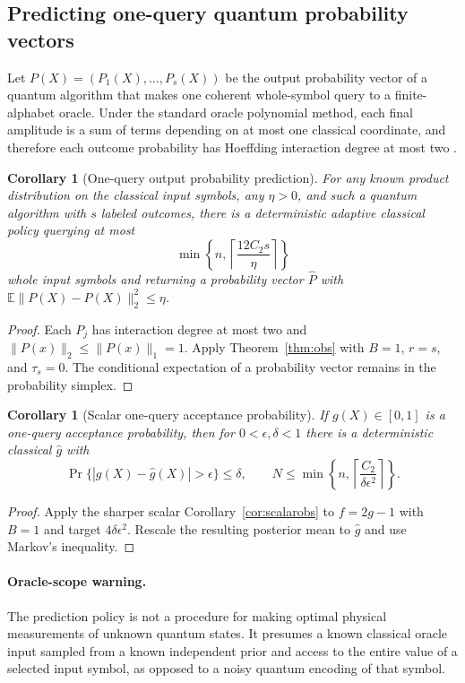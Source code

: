 \documentclass[11pt,letterpaper]{article}
\newtheorem{corollary}[theorem]{Corollary}
\theoremstyle{definition}
\newcommand{\E}{\mathbb E}
\newcommand{\norm}[1]{\lVert #1\rVert}
\begin{document}
\subsection{Predicting one-query quantum probability vectors}
Let $P(X)=(P_1(X),\ldots,P_s(X))$ be the output probability vector of a
quantum algorithm that makes one coherent whole-symbol query to a
finite-alphabet oracle. Under the standard oracle polynomial method,
each final amplitude is a sum of terms depending on at most one
classical coordinate, and therefore each outcome probability has
Hoeffding interaction degree at most two \cite{BBCMW2001}.
\begin{corollary}[One-query output probability prediction]\label{cor:oneq}
For any known product distribution on the classical input symbols,
any $\eta>0$, and such a quantum algorithm with $s$ labeled outcomes,
there is a deterministic adaptive classical policy querying at most
\[\min\left\{n,\left\lceil\frac{12C_2s}{\eta}\right\rceil\right\}
\]
whole input symbols and returning a probability vector $\widehat P$
with $\E\norm{P(X)-\widehat P(X)}_2^2\le\eta$.
\end{corollary}
\begin{proof}
Each $P_j$ has interaction degree at most two and
$\norm{P(x)}_2\le\norm{P(x)}_1=1$. Apply Theorem~\ref{thm:obs} with
$B=1$, $r=s$, and $\tau_s=0$. The conditional expectation of a
probability vector remains in the probability simplex.
\end{proof}
\begin{corollary}[Scalar one-query acceptance probability]\label{cor:oneqscalar}
If $g(X)\in[0,1]$ is a one-query acceptance probability, then for
$0<\epsilon,\delta<1$ there is a deterministic classical
$\widehat g$ with
\begin{equation}\label{eq:markov}
\Pr\{|g(X)-\widehat g(X)|>\epsilon\}\le\delta,
\qquad N\le\min\left\{n,\left\lceil\frac{C_2}{\delta\epsilon^2}\right\rceil\right\}.
\end{equation}
\end{corollary}
\begin{proof}
Apply the sharper scalar Corollary~\ref{cor:scalarobs} to $f=2g-1$
with $B=1$ and target $4\delta\epsilon^2$. Rescale the resulting posterior mean
to $\widehat g$ and use Markov's inequality.
\end{proof}
\paragraph{Oracle-scope warning.}
The prediction policy is not a procedure for making optimal physical
measurements of unknown quantum states. It presumes a known classical
oracle input sampled from a known independent prior and access to the
entire value of a selected input symbol, as opposed to a noisy
quantum encoding of that symbol.
\end{document}

